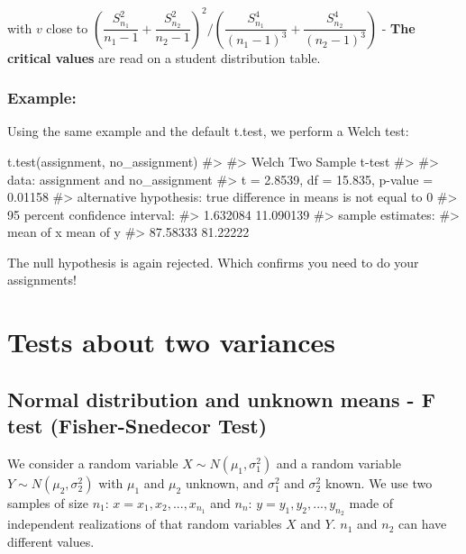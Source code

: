 \documentclass[
  letterpaper,
  DIV=11,
  numbers=noendperiod]{scrreprt}
\newenvironment{Shaded}{\begin{snugshade}}{\end{snugshade}}
\newcommand{\CommentTok}[1]{\textcolor[rgb]{0.37,0.37,0.37}{#1}}
\newcommand{\FunctionTok}[1]{\textcolor[rgb]{0.28,0.35,0.67}{#1}}
\newcommand{\NormalTok}[1]{\textcolor[rgb]{0.00,0.23,0.31}{#1}}
\begin{document}
with \(v\) close to
\((\dfrac{S^2_{n_1}} {n_1 - 1} + \dfrac{S^2_{n_2}} {n_2 - 1})^2 / (\dfrac{S^4_{n_1}} {(n_1 - 1)^3} + \dfrac{S^4_{n_2}} {(n_2 - 1)^3})\)
- \textbf{The critical values} are read on a student distribution table.

\subsubsection{Example:}\label{example-10}

Using the same example and the default t.test, we perform a Welch test:

\begin{Shaded}
\begin{Highlighting}[]
\FunctionTok{t.test}\NormalTok{(assignment, no\_assignment)}
\CommentTok{\#\textgreater{} }
\CommentTok{\#\textgreater{}  Welch Two Sample t{-}test}
\CommentTok{\#\textgreater{} }
\CommentTok{\#\textgreater{} data:  assignment and no\_assignment}
\CommentTok{\#\textgreater{} t = 2.8539, df = 15.835, p{-}value = 0.01158}
\CommentTok{\#\textgreater{} alternative hypothesis: true difference in means is not equal to 0}
\CommentTok{\#\textgreater{} 95 percent confidence interval:}
\CommentTok{\#\textgreater{}   1.632084 11.090139}
\CommentTok{\#\textgreater{} sample estimates:}
\CommentTok{\#\textgreater{} mean of x mean of y }
\CommentTok{\#\textgreater{}  87.58333  81.22222}
\end{Highlighting}
\end{Shaded}

The null hypothesis is again rejected. Which confirms you need to do
your assignments!

\section{Tests about two variances}\label{tests-about-two-variances}

\subsection{Normal distribution and unknown means - F test
(Fisher-Snedecor
Test)}\label{normal-distribution-and-unknown-means---f-test-fisher-snedecor-test}

We consider a random variable \(X \sim N(\mu_1, \sigma_1^2)\) and a
random variable \(Y \sim N(\mu_2, \sigma_2^2)\) with \(\mu_1\) and
\(\mu_2\) unknown, and \(\sigma_1^2\) and \(\sigma_2^2\) known. We use
two samples of size \(n_1\): \(x = {x_1, x_2,..., x_{n_1}}\) and
\(n_n\): \(y = {y_1, y_2,..., y_{n_2}}\) made of independent
realizations of that random variables \(X\) and \(Y\). \(n_1\) and
\(n_2\) can have different values.
\end{document}
